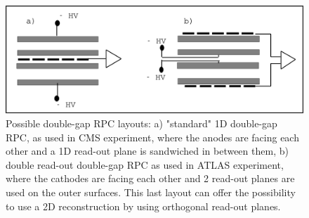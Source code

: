 	\begin{figure}[H]
		\centering
		\includegraphics[width = \plotwidth]{fig/chapt4/Double_gap_layouts.pdf}
		\caption{\label{fig:DGLayout} Possible double-gap RPC layouts: a) "standard" 1D double-gap RPC, as used in CMS experiment, where the anodes are facing each other and a 1D read-out plane is sandwiched in between them,  b) double read-out double-gap RPC as used in ATLAS experiment, where the cathodes are facing each other and 2 read-out planes are used on the outer surfaces. This last layout can offer the possibility to use a 2D reconstruction by using orthogonal read-out planes.}
	\end{figure}
	
